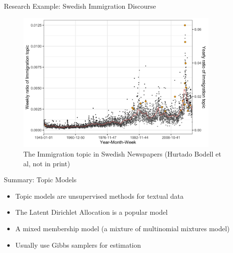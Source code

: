 \documentclass[10pt]{beamer}
\begin{document}
\begin{frame}{Research Example: Swedish Immigration Discourse}

\begin{figure}[h]
\begin{center}
\includegraphics[width=0.9\textwidth]{fig/weekly_yearly_tot_outliers.png}
\caption{The Immigration topic in Swedish Newspapers (Hurtado Bodell et al, not in print)}
\end{center}
\end{figure}

\end{frame}


\begin{frame}{Summary: Topic Models}

\begin{itemize}
    \item Topic models are unsupervised methods for textual data\pause
    \item The Latent Dirichlet Allocation is a popular model\pause
    \item A mixed membership model (a mixture of multinomial mixtures model)\pause
    \item Usually use Gibbs samplers for estimation
\end{itemize}
\end{frame}
\end{document}
